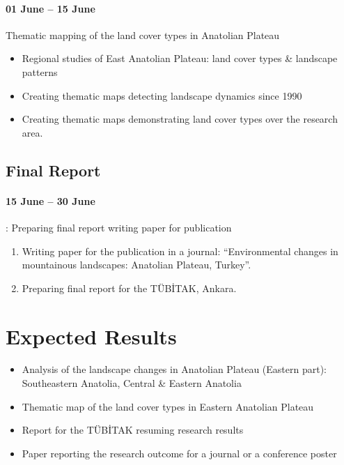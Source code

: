 \documentclass[10pt]{hitec}
\begin{document}
\paragraph{01 June – 15 June} Thematic mapping of the land cover types in Anatolian Plateau
\begin{itemize}
	\item Regional studies of East Anatolian Plateau: land cover types \& landscape patterns
	\item Creating thematic maps detecting landscape dynamics since 1990
	\item Creating thematic maps demonstrating land cover types over the research area.
\end{itemize}

\subsection{Final Report}
\paragraph{15 June – 30 June}: Preparing final report writing paper for publication
\begin{enumerate}
	\item Writing paper for the publication in a journal: “Environmental changes in mountainous landscapes: Anatolian Plateau, Turkey”.
	\item Preparing final report for the TÜBİTAK, Ankara.
\end{enumerate}

\section{Expected Results}
\begin{itemize}
	\item Analysis of the landscape changes in Anatolian Plateau (Eastern part): Southeastern Anatolia, Central \& Eastern Anatolia
	\item Thematic map of the land cover types in Eastern Anatolian Plateau
	\item Report for the TÜBİTAK resuming research results
	\item Paper reporting the research outcome for a journal or a conference poster 
\end{itemize}

	
\end{document}
